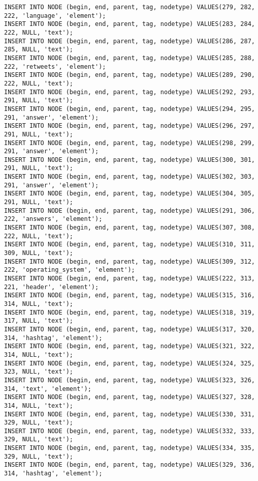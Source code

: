 \begin{verbatim}
INSERT INTO NODE (begin, end, parent, tag, nodetype) VALUES(279, 282, 222, 'language', 'element');
INSERT INTO NODE (begin, end, parent, tag, nodetype) VALUES(283, 284, 222, NULL, 'text');
INSERT INTO NODE (begin, end, parent, tag, nodetype) VALUES(286, 287, 285, NULL, 'text');
INSERT INTO NODE (begin, end, parent, tag, nodetype) VALUES(285, 288, 222, 'retweets', 'element');
INSERT INTO NODE (begin, end, parent, tag, nodetype) VALUES(289, 290, 222, NULL, 'text');
INSERT INTO NODE (begin, end, parent, tag, nodetype) VALUES(292, 293, 291, NULL, 'text');
INSERT INTO NODE (begin, end, parent, tag, nodetype) VALUES(294, 295, 291, 'answer', 'element');
INSERT INTO NODE (begin, end, parent, tag, nodetype) VALUES(296, 297, 291, NULL, 'text');
INSERT INTO NODE (begin, end, parent, tag, nodetype) VALUES(298, 299, 291, 'answer', 'element');
INSERT INTO NODE (begin, end, parent, tag, nodetype) VALUES(300, 301, 291, NULL, 'text');
INSERT INTO NODE (begin, end, parent, tag, nodetype) VALUES(302, 303, 291, 'answer', 'element');
INSERT INTO NODE (begin, end, parent, tag, nodetype) VALUES(304, 305, 291, NULL, 'text');
INSERT INTO NODE (begin, end, parent, tag, nodetype) VALUES(291, 306, 222, 'answers', 'element');
INSERT INTO NODE (begin, end, parent, tag, nodetype) VALUES(307, 308, 222, NULL, 'text');
INSERT INTO NODE (begin, end, parent, tag, nodetype) VALUES(310, 311, 309, NULL, 'text');
INSERT INTO NODE (begin, end, parent, tag, nodetype) VALUES(309, 312, 222, 'operating_system', 'element');
INSERT INTO NODE (begin, end, parent, tag, nodetype) VALUES(222, 313, 221, 'header', 'element');
INSERT INTO NODE (begin, end, parent, tag, nodetype) VALUES(315, 316, 314, NULL, 'text');
INSERT INTO NODE (begin, end, parent, tag, nodetype) VALUES(318, 319, 317, NULL, 'text');
INSERT INTO NODE (begin, end, parent, tag, nodetype) VALUES(317, 320, 314, 'hashtag', 'element');
INSERT INTO NODE (begin, end, parent, tag, nodetype) VALUES(321, 322, 314, NULL, 'text');
INSERT INTO NODE (begin, end, parent, tag, nodetype) VALUES(324, 325, 323, NULL, 'text');
INSERT INTO NODE (begin, end, parent, tag, nodetype) VALUES(323, 326, 314, 'text', 'element');
INSERT INTO NODE (begin, end, parent, tag, nodetype) VALUES(327, 328, 314, NULL, 'text');
INSERT INTO NODE (begin, end, parent, tag, nodetype) VALUES(330, 331, 329, NULL, 'text');
INSERT INTO NODE (begin, end, parent, tag, nodetype) VALUES(332, 333, 329, NULL, 'text');
INSERT INTO NODE (begin, end, parent, tag, nodetype) VALUES(334, 335, 329, NULL, 'text');
INSERT INTO NODE (begin, end, parent, tag, nodetype) VALUES(329, 336, 314, 'hashtag', 'element');

\end{verbatim}
